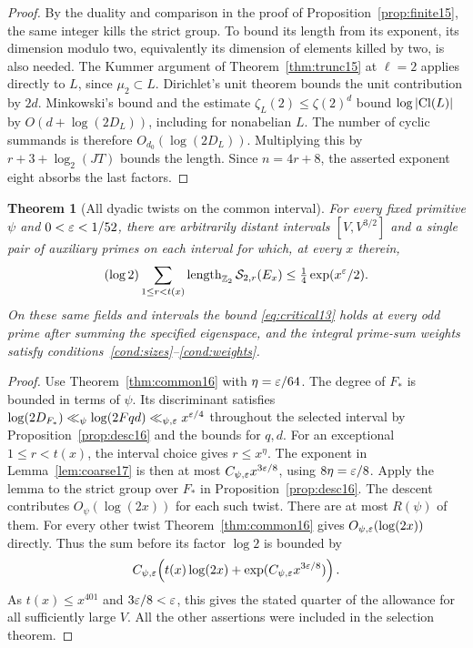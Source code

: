 \documentclass[a4paper,11pt]{article}
\newtheorem{theorem}[proposition]{Theorem}
\theoremstyle{definition}
\theoremstyle{remark}
\newcommand{\ZZ}{\mathbb Z}\newcommand{\ord}{\operatorname{ord}}
\newcommand{\len}{\operatorname{length}}\newcommand{\Res}{\operatorname*{Res}}
\numberwithin{equation}{section}
\begin{document}
\begin{proof}
By the duality and comparison in the proof of Proposition~\ref{prop:finite15}, the same integer kills the strict group. To bound its length from its exponent, its dimension modulo two, equivalently its dimension of elements killed by two, is also needed. The Kummer argument of Theorem~\ref{thm:trunc15} at \(\ell=2\) applies directly to \(L\), since \(\mu_2\subset L\). Dirichlet's unit theorem bounds the unit contribution by \(2d\). Minkowski's bound and the estimate \(\zeta_L(2)\le\zeta(2)^d\) bound \(\log|{\rm Cl}(L)|\) by \(O(d+\log(2D_L))\), including for nonabelian \(L\). The number of cyclic summands is therefore \(O_{d_0}(\log(2D_L))\). Multiplying this by \(r+3+\log_2(JT)\) bounds the length. Since \(n=4r+8\), the asserted exponent eight absorbs the last factors.
\end{proof}

\begin{theorem}[All dyadic twists on the common interval]\label{thm:two17}
For every fixed primitive \(\psi\) and \(0<\varepsilon<1/52\), there are arbitrarily distant intervals \([V,V^{3/2}]\) and a single pair of auxiliary primes on each interval for which, at every \(x\) therein,
\[
 (\log2)\sum_{1\le r<t(x)}\len_{\ZZ_2}\mathcal S_{2,r}(E_x)
                   \le \tfrac14\exp(x^\eps/2).
\]
On these same fields and intervals the bound \eqref{eq:critical13} holds at every odd prime after summing the specified eigenspace, and the integral prime-sum weights satisfy conditions~\ref{cond:sizes}--\ref{cond:weights}.
\end{theorem}
\begin{proof}
Use Theorem~\ref{thm:common16} with \(\eta=\varepsilon/64\). The degree of \(F_*\) is bounded in terms of \(\psi\). Its discriminant satisfies \(\log(2D_{F_*})\ll_\psi\log(2Fqd)\ll_{\psi,\varepsilon} x^{\varepsilon/4}\) throughout the selected interval by Proposition~\ref{prop:desc16} and the bounds for \(q,d\). For an exceptional \(1\le r<t(x)\), the interval choice gives \(r\le x^\eta\). The exponent in Lemma~\ref{lem:coarse17} is then at most \(C_{\psi,\varepsilon}x^{3\varepsilon/8}\), using \(8\eta=\varepsilon/8\). Apply the lemma to the strict group over \(F_*\) in Proposition~\ref{prop:desc16}. The descent contributes \(O_\psi(\log(2x))\) for each such twist. There are at most \(R(\psi)\) of them. For every other twist Theorem~\ref{thm:common16} gives \(O_{\psi,\varepsilon}(\log(2x))\) directly. Thus the sum before its factor \(\log2\) is bounded by
\[
 C_{\psi,\varepsilon}\!\left(t(x)\log(2x)
                     +\exp(C_{\psi,\varepsilon}x^{3\varepsilon/8})\right).
\]
As \(t(x)\le x^{401}\) and \(3\varepsilon/8<\varepsilon\), this gives the stated quarter of the allowance for all sufficiently large \(V\). All the other assertions were included in the selection theorem.
\end{proof}
\end{document}
